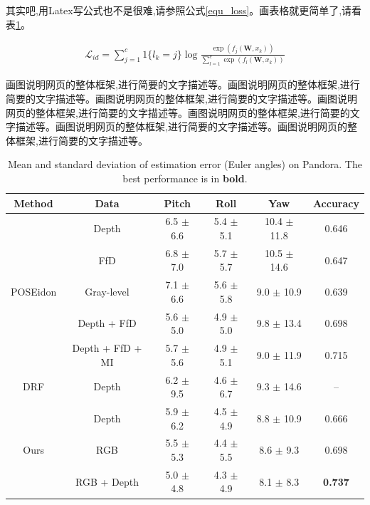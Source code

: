\documentclass[supercite]{Experimental_Report}
\theoremstyle{definition}
\begin{document}
其实吧,用Latex写公式也不是很难,请参照公式\ref{equ_loss}。画表格就更简单了,请看表\ref{table2}。

\begin{eqnarray}\label{equ_loss}
	\mathcal{L}_{id}=\sum_{j=1}^{c}1\{l_k=j\}\log\frac{\exp(f_j(\textbf{W},x_k))}{\sum\nolimits_{l=1}^{c}\exp(f_l(\textbf{W},x_k))}
\end{eqnarray}

画图说明网页的整体框架,进行简要的文字描述等。画图说明网页的整体框架,进行简要的文字描述等。画图说明网页的整体框架,进行简要的文字描述等。画图说明网页的整体框架,进行简要的文字描述等。画图说明网页的整体框架,进行简要的文字描述等。画图说明网页的整体框架,进行简要的文字描述等。画图说明网页的整体框架,进行简要的文字描述等。

\begin{table}
	\begin{center}
		\setlength{\tabcolsep}{2.0mm}
		\caption{Mean and standard deviation of estimation error (Euler angles) on Pandora. The best performance is in \textbf{bold}.}
		\label{table2}
		\begin{tabular}{c|ccccc}
			\hline
			Method    			        & Data               & Pitch         & Roll           & Yaw              & Accuracy\\
			\hline
			\hline			
			\multirow{5}{*}{POSEidon}   & Depth              & 6.5 $\pm$ 6.6  & 5.4 $\pm$ 5.1  & 10.4 $\pm$ 11.8  & 0.646\\
			& FfD              	 & 6.8 $\pm$ 7.0  & 5.7 $\pm$ 5.7  & 10.5 $\pm$ 14.6  & 0.647\\
			& Gray-level         & 7.1 $\pm$ 6.6  & 5.6 $\pm$ 5.8  & 9.0  $\pm$ 10.9  & 0.639\\
			& Depth + FfD	     & 5.6 $\pm$ 5.0  & 4.9 $\pm$ 5.0  & 9.8  $\pm$ 13.4  & 0.698\\
			& Depth + FfD + MI   & 5.7 $\pm$ 5.6  & 4.9 $\pm$ 5.1  & 9.0  $\pm$ 11.9  & 0.715\\
			\hline
			DRF                         & Depth              & 6.2 $\pm$ 9.5  & 4.6 $\pm$ 6.7  & 9.3  $\pm$ 14.6  & --\\
			\hline
			\multirow{3}{*}{Ours}   	& Depth              & 5.9 $\pm$ 6.2  & 4.5 $\pm$ 4.9  & 8.8  $\pm$ 10.9  & 0.666\\
			& RGB                & 5.5 $\pm$ 5.3  & 4.4 $\pm$ 5.5  & 8.6  $\pm$ 9.3   & 0.698\\
			& RGB + Depth        & 5.0 $\pm$ 4.8  & 4.3 $\pm$ 4.9  & 8.1  $\pm$ 8.3   & \textbf{0.737}\\
			\hline
		\end{tabular}
	\end{center}
\end{table}
\end{document}
